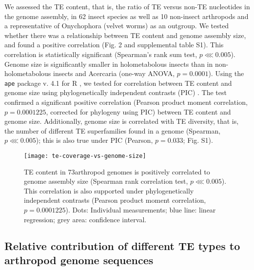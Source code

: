 We assessed the TE content, that is, the ratio of TE versus non-TE
nucleotides in the genome assembly, in 62 insect species as well as 10
non-insect arthropods and a representative of Onychophora (velvet worms)
as an outgroup. We tested whether there was a relationship between TE
content and genome assembly size, and found a positive correlation (Fig.
2 and supplemental table S1). This correlation is statistically
significant (Spearman's rank sum test, \(p \lll 0.005\)). Genome size is
significantly smaller in holometabolous insects than in
non-holometabolous insects and Acercaria (one-way ANOVA, \(p =
0.0001\)). Using the \texttt{ape} package v. 4.1 \citep{Paradis2004} for
R \citep{RCoreTeam2017}, we tested for correlation between TE content
and genome size using phylogenetically independent contrasts (PIC)
\citep{Felsenstein1985}. The test confirmed a significant positive
correlation (Pearson product moment correlation, \(p = 0.0001225\),
corrected for phylogeny using PIC) between TE content and genome size.
Additionally, genome size is correlated with TE diversity, that is, the
number of different TE superfamilies found in a genome (Spearman, \(p
\lll 0.005\)); this is also true under PIC (Pearson, \(p = 0.033\); Fig.
S1).

\begin{figure}[h!]
\begin{center}
\texttt{[image: te-coverage-vs-genome-size]}
\caption[TE content is positively correlated to genome size]{{TE content
in 73arthropod genomes is positively correlated to genome assembly size
(Spearman rank correlation test, \(p \lll 0.005\)). This correlation is
also supported under phylogenetically independent contrasts
\protect\citep{Felsenstein1985} (Pearson product moment correlation, \(p
= 0.0001225\)). Dots: Individual measurements; blue line: linear
regression; grey area: confidence interval.%
}}
\end{center}
\end{figure}

\subsection{Relative contribution of different TE types to arthropod
genome
sequences}\label{relative-contribution-of-different-te-types-to-arthropod-genome-sequences}

